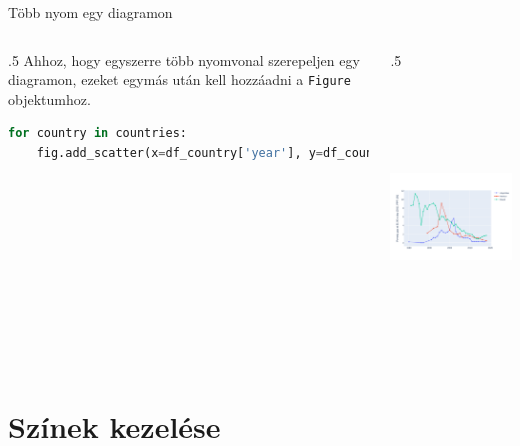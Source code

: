 \documentclass[english, aspectratio=169]{beamer}
\makeatletter
\let\origtableofcontents=\tableofcontents
\def\tableofcontents{\@ifnextchar[{\origtableofcontents}{\gobbletableofcontents}}
\def\gobbletableofcontents#1{\origtableofcontents}
\makeatother
\begin{document}
\begin{frame}[fragile]{Több nyom egy diagramon}
	\begin{columns}
		\begin{column}{.5\textwidth}
			Ahhoz, hogy egyszerre több nyomvonal szerepeljen egy diagramon, ezeket egymás után kell hozzáadni a \texttt{Figure} objektumhoz.\par\medskip
			\begin{lstlisting}[language=python]
for country in countries:
	fig.add_scatter(x=df_country['year'], y=df_country[perc_pov_19], name=country, mode='markers+lines')
			\end{lstlisting}
		\end{column}
		\begin{column}{.5\textwidth}
			\begin{center}
				\includegraphics[width=7cm, height=7cm, keepaspectratio]{images/scatter_8.png}
			\end{center}
		\end{column}
	\end{columns}
\end{frame}

\section{Színek kezelése}

\begin{frame}{}
	\tableofcontents[currentsection]
\end{frame}
\end{document}
